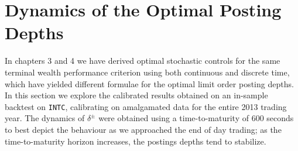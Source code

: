 \section{Dynamics of the Optimal Posting Depths}

In chapters 3 and 4 we have derived optimal stochastic controls for the same terminal wealth performance criterion using both continuous and discrete time, which have yielded different formulae for the optimal limit order posting depths. In this section we explore the calibrated results obtained on an in-sample backtest on \texttt{INTC}, calibrating on amalgamated data for the entire 2013 trading year. The dynamics of $\delta^\pm$ were obtained using a time-to-maturity of 600 seconds to best depict the behaviour as we approached the end of day trading; as the time-to-maturity horizon increases, the postings depths tend to stabilize. 

